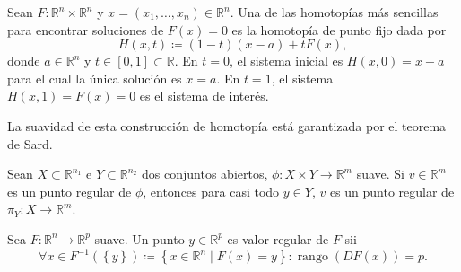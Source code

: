 \begin{frame}
	\begin{definition}
		Sean
		\begin{math}
			F\colon\mathbb{R}^{n}\times\mathbb{R}^{n}
		\end{math}
		y
		\begin{math}
			x=\left(x_{1},\dotsc,x_{n}\right)\in\mathbb{R}^{n}
		\end{math}.
		Una de las homotopías más sencillas para encontrar soluciones de
		$F\left(x\right)=0$ es la \alert{homotopía de punto fijo} dada
		por
		\begin{equation*}
			H\left(x,t\right)\coloneqq
			\left(1-t\right)\left(x-a\right)+tF\left(x\right),
		\end{equation*}
		donde $a\in\mathbb{R}^{n}$ y
		$t\in\left[0,1\right]\subset\mathbb{R}$.
		En $t=0$, el sistema inicial es $H\left(x,0\right)=x-a$
		para el cual la única solución es $x=a$.
		En $t=1$, el sistema $H\left(x,1\right)=F\left(x\right)=0$ es el
		sistema de interés.
	\end{definition}
	La suavidad de esta construcción de homotopía está garantizada por
	el teorema de Sard.
	\begin{theorem}
		Sean $X\subset\mathbb{R}^{n_{1}}$ e $Y\subset\mathbb{R}^{n_{2}}$
		dos conjuntos abiertos, $\phi\colon X\times Y\to\mathbb{R}^{m}$
		suave.
		Si $v\in\mathbb{R}^{m}$ es un punto regular de $\phi$, entonces
		para casi todo $y\in Y$, $v$ es un punto regular de
		$\pi_{Y}\colon X\to\mathbb{R}^{m}$.
	\end{theorem}

	\begin{definition}
		Sea $F\colon\mathbb{R}^{n}\to\mathbb{R}^{p}$ suave.
		Un punto $y\in\mathbb{R}^{p}$ es \alert{valor regular} de $F$ sii
		\begin{equation*}
			\forall x\in F^{-1}\left(\left\{y\right\}\right)\coloneqq
			\left\{
			x\in\mathbb{R}^{n}\mid
			F\left(x\right)=y
			\right\}:
			\operatorname{rango}\left(DF\left(x\right)\right)=p.
		\end{equation*}
	\end{definition}
\end{frame}

